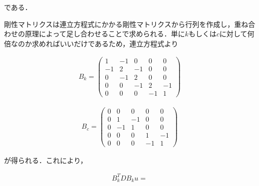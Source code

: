 である．

剛性マトリクスは連立方程式にかかる剛性マトリクスから行列を作成し，重ね合わせの原理によって足し合わせることで求められる．単に$k$もしくは$c$に対して何倍なのか求めればいいだけであるため，連立方程式より

\begin{eqnarray}
    B_k = 
    \left(\begin{matrix}
        1   & -1  & 0   & 0   & 0  \\
        -1  & 2   & -1  & 0   & 0  \\
        0   & -1  & 2   & 0   & 0  \\
        0   & 0   & -1  & 2   & -1 \\
        0   & 0   & 0   & -1  & 1
    \end{matrix}\right)
\end{eqnarray}

\begin{eqnarray}
    B_c = 
    \left(\begin{matrix}
        0   & 0   & 0   & 0   & 0   \\
        0   & 1   & -1  & 0   & 0   \\
        0   & -1  & 1   & 0   & 0   \\
        0   & 0   & 0   & 1   & -1  \\
        0   & 0   & 0   & -1  & 1
    \end{matrix}\right)
\end{eqnarray}

が得られる．これにより，

\begin{eqnarray}
    B_k^T D B_k u =
\end{eqnarray}